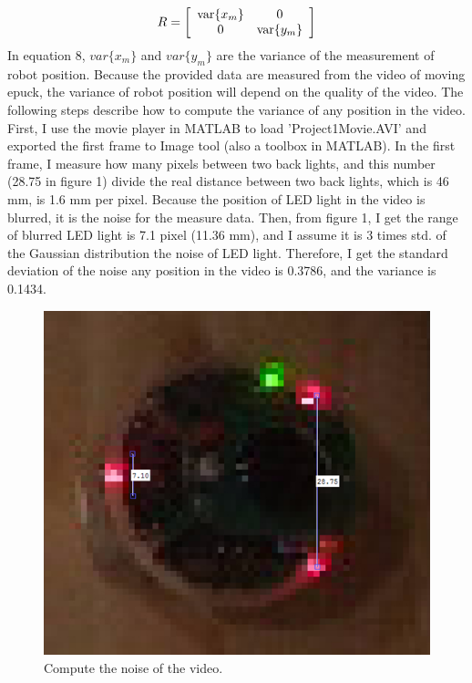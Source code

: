 \documentclass{article}
\begin{document}
\begin{equation}
	R = \left[ {\begin{array}{*{20}c}
	   {{\mathop{\rm var}} \{ x_m \} } & 0  \\
	   0 & {{\mathop{\rm var}} \{ y_m \} }  \\
	\end{array}} \right]
\end{equation}
In equation 8, $var\{x_m\}$ and $var\{y_m\}$ are the variance of the measurement of robot position. Because the 
provided data are measured from the video of moving epuck, the variance of robot position will depend on the 
quality of the video. The following steps describe how to compute the variance of  any position in the video. First,
 I use the movie player in MATLAB to load 'Project1Movie.AVI' and exported the first frame to Image tool (also a 
 toolbox in MATLAB). In the first frame, I measure how many pixels between two back lights, and this number (28.75 
 in figure 1) divide the real distance between two back lights, which is 46 mm, is 1.6 mm per pixel. Because the 
 position of LED light in the video is blurred, it is the noise for the measure data. Then, from figure 1, I get the range 
 of blurred LED light is 7.1 pixel  (11.36 mm), and I assume it is 3 times std. of the Gaussian distribution the noise of
 LED light. Therefore, I get the standard deviation of the noise any position in the video is 0.3786, and the variance is 
 0.1434. 
 \begin{figure}[H]
	 \begin{center}
	 	\includegraphics[width=\textwidth]{measure_noise.jpg}
	 	\caption{Compute the noise of the video.}
	 \end{center}
 \end{figure}
\end{document}
